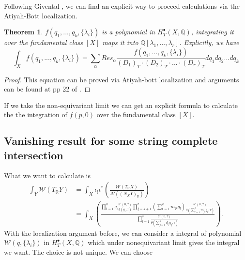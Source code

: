 \documentclass[11pt]{article}
\newtheorem{thm}{Theorem}[section]
\newcommand{\reals}{\mathbb R}
\newcommand{\ratl}{\mathbb Q}
\begin{document}
Following Givental \cite{givental1998mirror}, we can find an explicit way to proceed calculations via the Atiyah-Bott localization.
\begin{thm}
$f(q_1,...,q_k,\{\lambda_i\})$ is a polynomial in $H^\bullet_T(X,\ratl)$, integrating it over the fundamental class $[X]$ maps it into $\ratl[\lambda_1,...,\lambda_r]$. Explicitly, we have
\begin{equation}\label{localization}
\int_{X} f(q_1,...,q_k,\{\lambda_i\})=\sum_\alpha Res_\alpha \frac{f(q_1,...,q_k,\{\lambda_i\})}{(D_1)_T\cdot (D_2)_T\cdot ...\cdot (D_r)_T} d q_1 dq_2...dq_k
\end{equation}
\end{thm}
\begin{proof}
This equation can be proved via Atiyah-bott localization and arguments can be  found at pp 22 of \cite{givental1998mirror}. 
\end{proof}
If we take the non-equivariant limit we can get an explicit formula to calculate the the integration of $f(p,0)$ over the fundamental class $[X]$.
\subsection{Vanishing result for some string complete intersection}
What we want to calculate is
\begin{equation*}
\begin{aligned}
\int_{Y} \mathcal{W}(T_\reals Y) 
& =\int_X \iota_!\iota^*\left(\frac{\mathcal{W}(T_\reals X)}{\mathcal{W}((N_X Y)_\reals)}\right)\\
& =\int_X \left(\frac{\prod_{i=1}^k q_i \frac{\theta'(0,\tau)}{\theta(q_i,\tau)}\prod_{j=k+1}^r (\sum_{t=1}^k m_{jt}q_t) \frac{\theta'(0,\tau)}{\theta(\sum_{t=1}^k m_{jt}q_t,\tau)}}{\prod_{l=1}^s \frac{\theta'(0,\tau)}{\theta(\sum_{j=1}^k d_{l j} q_j,\tau)}}\right).
\end{aligned}
\end{equation*}
With the localization argument before, we can consider a integral of polynomial $\mathcal{W}(q,\{\lambda_i\})$ in $H^\bullet_T(X,\ratl)$ which under nonequivariant limit gives the integral we want. The choice is not unique. We can choose
\end{document}
